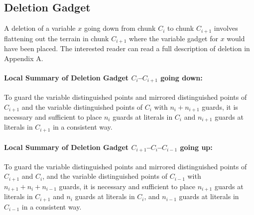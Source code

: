 \documentclass[11pt]{article}
\begin{document}
\subsection{Deletion Gadget}

A deletion of a variable $x$ going down from chunk $C_i$ to chunk $C_{i+1}$ involves flattening out the terrain in chunk $C_{i+1}$ where the variable gadget for $x$ would have been placed.  The interested reader can read a full description of deletion in Appendix A.

\paragraph{Local Summary of Deletion Gadget $C_i$--$C_{i+1}$ going down:}  To guard the variable distinguished points and mirrored distinguished points of $C_{i+1}$ and the variable distinguished points of $C_i$ with $n_i + n_{i+1}$ guards, it is necessary and sufficient to place $n_i$ guards at literals in $C_i$ and $n_{i+1}$ guards at
literals in $C_{i+1}$ in a consistent way.

\paragraph{Local Summary of Deletion Gadget $C_{i+1}$--$C_i$--$C_{i-1}$ going up:}  To guard the variable distinguished points and mirrored distinguished points of $C_{i+1}$ and $C_i$, and the variable distinguished points of $C_{i-1}$ with $n_{i+1} + n_i + n_{i-1}$ guards, it is necessary and sufficient to place $n_{i+1}$ guards at literals in $C_{i+1}$ and $n_i$ guards at literals in $C_i$, and $n_{i-1}$ guards at literals in $C_{i-1}$ in a consistent way.
\end{document}
